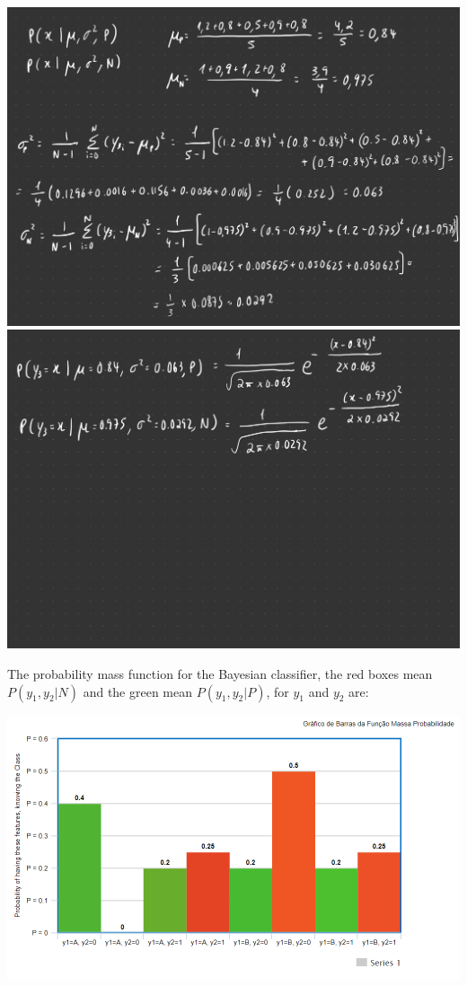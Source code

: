 \documentclass[12pt]{article}
\begin{document}
\begin{enumerate}[leftmargin=\labelsep]
\begin{center}
\newline
\includegraphics[scale=0.2]{images/Project-14.jpg}
\newline
\includegraphics[scale=0.2]{images/Project-15.jpg}
\newline
\end{center}
\newpage
The probability mass function for the Bayesian classifier, the red boxes mean $P(y_1, y_2 | N)$ and the green mean $P(y_1, y_2 | P)$, for $y_1$ and $y_2$ are:
\begin{center}
    \includegraphics[]{images/graficobarras.png}

\end{center}
\end{enumerate}
\end{document}

